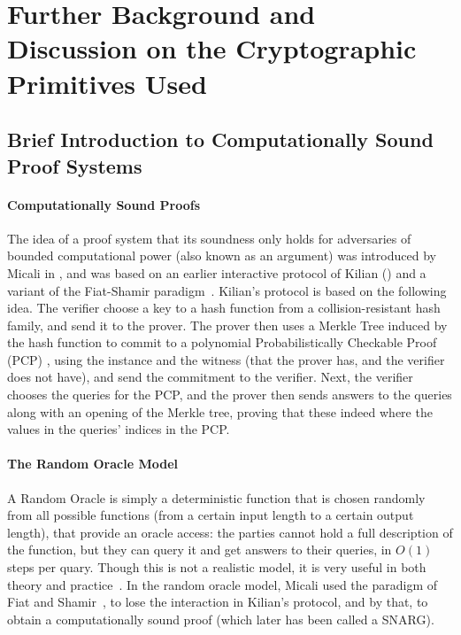 \section{Further Background and Discussion on the Cryptographic Primitives Used}
\label{app:crypto}

\subsection{Brief Introduction to Computationally Sound Proof Systems}
\paragraph{Computationally Sound Proofs}
The idea of a proof system that its soundness only holds for adversaries of bounded computational power (also known as an argument) was introduced by Micali in \cite{micali2000computationally}, and was based on an earlier interactive protocol of Kilian (\cite{kilian1992note}) and a variant of the Fiat-Shamir paradigm~\cite{fiat1986prove}.
Kilian's protocol is based on the following idea. The verifier choose a key to a hash function from a collision-resistant hash family, and send it to the prover. The prover then uses a Merkle Tree \cite{merkle1989certified} induced by the hash function to commit to a polynomial Probabilistically Checkable Proof (PCP) \cite{babai1991checking, arora1998probabilistic, arora1998proof, feige1991approximating}, using the instance and the witness (that the prover has, and the verifier does not have), and send the commitment to the verifier. Next, the verifier chooses the queries for the PCP, and the prover then sends answers to the queries along with an opening of the Merkle tree, proving that these indeed where the values in the queries' indices in the PCP.
\paragraph{The Random Oracle Model}
A Random Oracle is simply a deterministic function that is chosen randomly from all possible functions (from a certain input length to a certain output length), that provide an oracle access: the parties cannot hold a full description of the function, but they can query it and get answers to their queries, in $O(1)$ steps per quary. Though this is not a realistic model, it is very useful in both theory and practice~\cite{ROM93BMR}. In the random oracle model, Micali used the paradigm of Fiat and Shamir~\cite{fiat1986prove}, to lose the interaction in Kilian's protocol, and by that, to obtain a computationally sound proof (which later has been called a SNARG).

